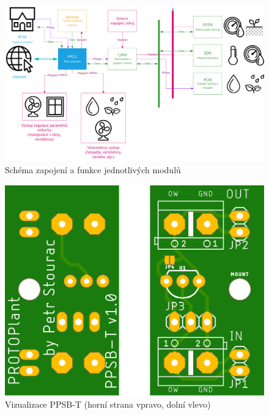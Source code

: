 

\begin{figure}[htbp]
    \centering
    \includegraphics[angle=90,origin=c,scale=0.7]{img/HARDWARE/MODULES.png}
    \caption{Schéma zapojení a funkce jednotlivých modulů}
    \label{fig:add-MODULES}
 \end{figure}

 \begin{figure}[h]
    \centering
    \includegraphics[width=\textwidth]{img/HARDWARE/PPSB-T_BOTH.png}
    \caption{Vizualizace PPSB-T (horní strana vpravo, dolní vlevo)}
    \label{fig:PPSB-T_VISUAL}
\end{figure}

